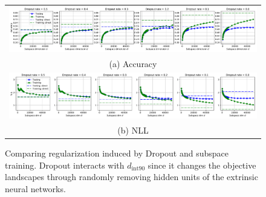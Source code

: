 \documentclass{article} %
\newcommand{\dintn}{d_{\mathrm{int90}}}
\begin{document}
\begin{figure}
  \centering
	\vspace{-0mm}
	\begin{tabular}{c}
		\hspace{-5mm}
		\includegraphics[width=14.4cm]{fnn_cifar_dropout_reg/fnn_cifar_dropout_reg_acc_all}
		\\
		(a) Accuracy \\
		\hspace{-5mm}
		\includegraphics[width=14.4cm]{fnn_cifar_dropout_reg/fnn_cifar_dropout_reg_nll_all}
		\\
		(b) NLL   %
	\end{tabular} \vspace{-2mm}
	\caption{Comparing regularization induced by Dropout and subspace training. Dropout interacts with $\dintn$ since it changes the objective landscapes through randomly removing hidden units of the extrinsic neural networks. }
	\label{fig:fnn_cifar_dropout}
	\vspace{-3mm}
\end{figure}
\end{document}
